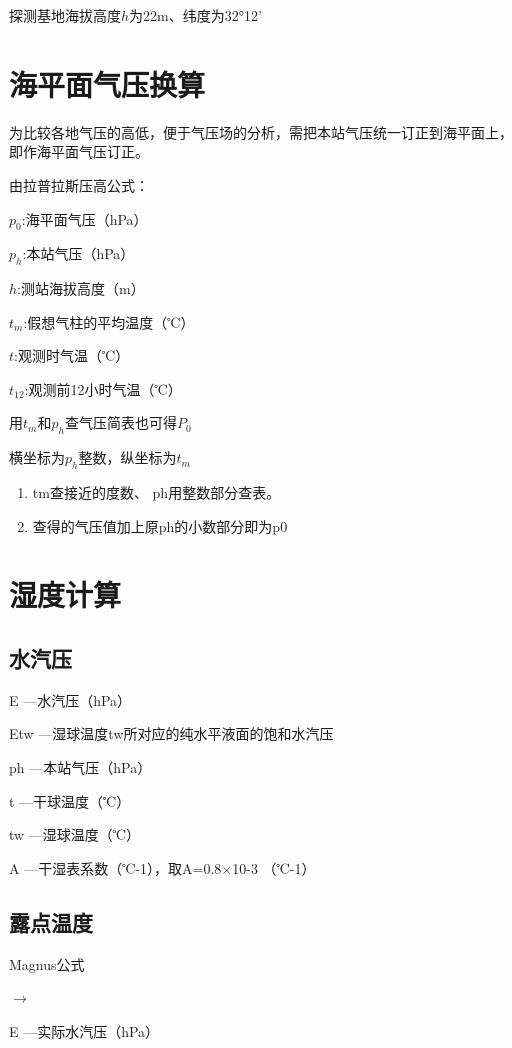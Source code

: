 ﻿\documentclass[UTF8,11pt]{ctexbook}%
\begin{document}
探测基地海拔高度\(h\)为22m、纬度为32°12’

\section{海平面气压换算}

为比较各地气压的高低，便于气压场的分析，需把本站气压统一订正到海平面上，即作海平面气压订正。

由拉普拉斯压高公式：

\(p_0\):海平面气压（hPa）

\(p_h\):本站气压（hPa）

\(h\):测站海拔高度（m）

\(t_m\):假想气柱的平均温度（℃）

\(t\):观测时气温（℃）

\(t_{12}\):观测前12小时气温（℃）

用\(t_m\)和\(p_h\)查气压简表也可得\(P_0\)

横坐标为\(p_h\)整数，纵坐标为\(t_m\)

\begin{enumerate}
	\item tm查接近的度数、 ph用整数部分查表。
	\item 查得的气压值加上原ph的小数部分即为p0
\end{enumerate}

\section{湿度计算}

\subsection{水汽压}

E —水汽压（hPa）

Etw —湿球温度tw所对应的纯水平液面的饱和水汽压

ph —本站气压（hPa）

t —干球温度（℃）

tw —湿球温度（℃）

A —干湿表系数（℃-1），取A=0.8×10-3 （℃-1）

\subsection{露点温度}

Magnus公式

\(\to\)

E —实际水汽压（hPa）
\end{document}
